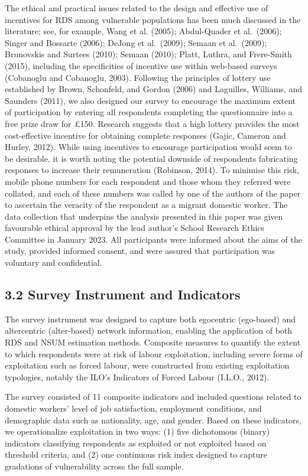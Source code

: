 \documentclass[
  12pt,
  letterpaper,
  DIV=11,
  numbers=noendperiod]{scrartcl}
\begin{document}
The ethical and practical issues related to the design and effective use
of incentives for RDS among vulnerable populations has been much
discussed in the literature; see, for example, Wang et al. (2005);
Abdul-Quader et al.~(2006); Singer and Bossarte (2006); DeJong et
al.~(2009); Semaan et al.~(2009); Brunovskis and Surtees (2010); Semaan
(2010); Platt, Luthra, and Frere-Smith (2015), including the
specificities of incentive use within web-based surveys (Cobanoglu and
Cobanoglu, 2003). Following the principles of lottery use established by
Brown, Schonfeld, and Gordon (2006) and Laguilles, Williams, and
Saunders (2011), we also designed our survey to encourage the maximum
extent of participation by entering all respondents completing the
questionnaire into a free prize draw for £150. Research suggests that a
high lottery provides the most cost-effective incentive for obtaining
complete responses (Gajic, Cameron and Hurley, 2012). While using
incentives to encourage participation would seem to be desirable, it is
worth noting the potential downside of respondents fabricating responses
to increase their remuneration (Robinson, 2014). To minimise this risk,
mobile phone numbers for each respondent and those whom they referred
were collated, and each of these numbers was called by one of the
authors of the paper to ascertain the veracity of the respondent as a
migrant domestic worker. The data collection that underpins the analysis
presented in this paper was given favourable ethical approval by the
lead author's School Research Ethics Committee in January 2023. All
participants were informed about the aims of the study, provided
informed consent, and were assured that participation was voluntary and
confidential.

\subsection{3.2 Survey Instrument and
Indicators}\label{survey-instrument-and-indicators}

The survey instrument was designed to capture both egocentric
(ego-based) and altercentric (alter-based) network information, enabling
the application of both RDS and NSUM estimation methods. Composite
measures to quantify the extent to which respondents were at risk of
labour exploitation, including severe forms of exploitation such as
forced labour, were constructed from existing exploitation typologies,
notably the ILO's Indicators of Forced Labour (I.L.O., 2012).

The survey consisted of 11 composite indicators and included questions
related to domestic workers' level of job satisfaction, employment
conditions, and demographic data such as nationality, age, and gender.
Based on these indicators, we operationalize exploitation in two ways:
(1) five dichotomous (binary) indicators classifying respondents as
exploited or not exploited based on threshold criteria, and (2) one
continuous risk index designed to capture gradations of vulnerability
across the full sample.
\end{document}
